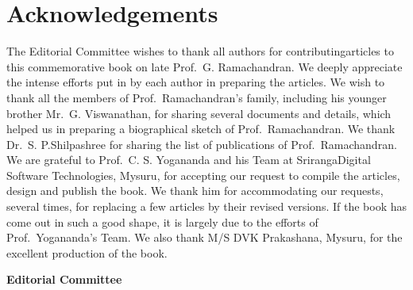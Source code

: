 \chapter*{Acknowledgements}

The Editorial Committee wishes to thank all authors for contributing\break articles to this commemorative book on late Prof.\ G. Ramachandran. We deeply appreciate the intense efforts put in by each author in preparing the articles. We wish to thank all the members of Prof.\ Ramachandran's family, including his younger brother Mr.\ G. Viswanathan, for sharing several documents and details, which helped us in preparing a biographical sketch of Prof.\ Ramachandran. We thank Dr.\ S. P.\break Shilpashree for sharing the list of publications of Prof.\ Ramachandran. We are grateful to Prof.\ C. S. Yogananda and his Team at Sriranga\break Digital Software Technologies, Mysuru, for accepting our request to compile the articles, design and publish the book. We thank him for accommodating our requests, several times, for replacing a few articles by their revised versions. If the book has come out in such a good shape, it is largely due to the efforts of Prof.\ Yogananda's Team.  We also thank M/S DVK Prakashana, Mysuru, for the excellent production of the book.
\vskip 2cm

\hfill	{\bf Editorial Committee}

